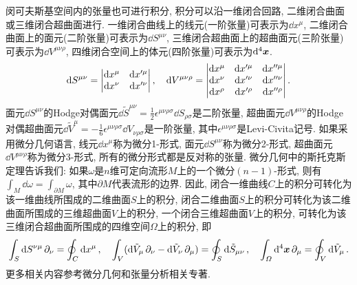\begin{proposition}[张量的微分与积分]
    闵可夫斯基空间内的张量也可进行积分, 积分可以沿一维闭合回路, 二维闭合曲面或三维闭合超曲面进行. 一维闭合曲线上的线元(一阶张量)可表示为$ \dd{x^{\mu}} $, 二维闭合曲面上的面元(二阶张量)可表示为$ \dd{S^{\mu\nu}} $, 三维闭合超曲面上的超曲面元(三阶张量)可表示为$ \dd{V^{\mu\nu\rho}} $, 四维闭合空间上的体元(四阶张量)可表示为$ \dd[4]{\vb*{x}} $.
    \begin{equation*}
        \dd{S^{\mu\nu}} = \mdet{\dd{x^{\mu}} & \dd{x^{\prime \mu}} \\ \dd{x^{\nu}} & \dd{x^{\prime \nu}}},
        \quad
        \dd{V^{\mu\nu\rho}} = \mdet{\dd{x^{\mu}} & \dd{x^{\prime \mu}} & \dd{x^{\prime \prime \mu}} \\ \dd{x^{\nu}} & \dd{x^{\prime \nu}} & \dd{x^{\prime \prime \nu}} \\ \dd{x^{\rho}} & \dd{x^{\prime \rho}} & \dd{x^{\prime \prime \rho}}}.
    \end{equation*}
    面元$ \dd{S^{\mu\nu}} $的Hodge对偶面元$ \dd{\tilde{S}^{\mu\nu}} = \frac{1}{2} \epsilon^{\mu\nu\rho\sigma} \dd{S_{\rho\sigma}} $是二阶张量, 超曲面元$ \dd{V^{\mu\nu\rho}} $的Hodge对偶超曲面元$ \dd{\tilde{V}^{\mu}} = -\frac{1}{6} \epsilon^{\mu\nu\rho\sigma} \dd{V_{\nu\rho\sigma}} $是一阶张量, 其中$ \epsilon^{\mu\nu\rho\sigma} $是Levi-Civita记号. 如果采用微分几何语言, 线元$ \dd{x^{\mu}} $称为微分1-形式, 面元$ \dd{S^{\mu\nu}} $称为微分2-形式, 超曲面元$ \dd{V^{\mu\nu\rho}} $称为微分3-形式, 所有的微分形式都是反对称的张量. 微分几何中的斯托克斯定理告诉我们: 如果$ \omega $是$ n $维可定向流形$ M $上的一个微分$ (n-1) $-形式, 则有$ \int_M \dd{\omega} = \int_{\partial M} \omega $, 其中$ \partial M $代表流形的边界. 因此, 闭合一维曲线$ C $上的积分可转化为该一维曲线所围成的二维曲面$ S $上的积分, 闭合二维曲面$ S $上的积分可转化为该二维曲面所围成的三维超曲面$ V $上的积分, 一个闭合三维超曲面$ V $上的积分, 可转化为该三维闭合超曲面所围成的四维空间$ \varOmega $上的积分, 即
    \begin{equation*}
        \int_S \dd{S^{\nu\mu}} \partial_{\nu} = \oint_C \dd{x^{\mu}}, \quad \int_V (\dd{\tilde{V}_{\mu}} \partial_{\nu} - \dd{\tilde{V}_{\nu}} \partial_{\mu}) = \oint_S \dd{\tilde{S}_{\mu\nu}}, \quad \int_{\varOmega} \dd[4]{\vb*{x}} \partial_{\mu} = \oint_V \dd{\tilde{V}_{\mu}}.
    \end{equation*}
    更多相关内容参考微分几何和张量分析相关专著.
\end{proposition}

